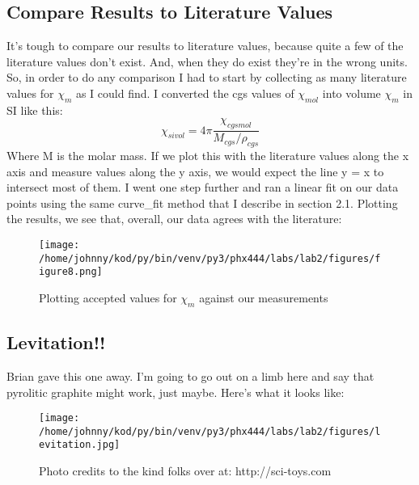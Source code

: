 \documentclass{article}
\begin{document}
\subsection{Compare Results to Literature Values}
It's tough to compare our results to literature values, because quite a few of
the literature values don't exist. And, when they do exist they're in the wrong
units. So, in order to do any comparison I had to start by collecting as many
literature values for $\chi_m$ as I could find. I converted the cgs values of
$\chi_{mol}$ into volume $\chi_m$ in SI like this:
$$\chi_{sivol} = 4 \pi\frac{\chi_{cgsmol}}{M_{cgs} / \rho_{cgs}} $$
Where M is the molar mass. If we plot this with the literature values along the
x axis and measure values along the y axis, we would expect the line y = x to
intersect most of them. I went one step further and ran a linear fit on our
data points using the same curve\_fit method that I describe in section 2.1.
Plotting the results, we see that, overall, our data agrees with the
literature:


\begin{figure}[H]
        \begin{center}
        \texttt{[image: /home/johnny/kod/py/bin/venv/py3/phx444/labs/lab2/figures/figure8.png]}
        \caption{Plotting accepted values for $\chi_m$ against our measurements}
        \label{fig:fig_5}
        \end{center}
\end{figure}

\subsection{Levitation!!}
Brian gave this one away. I'm going to go out on a limb here and say that
pyrolitic graphite might work, just maybe. Here's what it looks like:


\begin{figure}[H]
        \begin{center}
        \texttt{[image: /home/johnny/kod/py/bin/venv/py3/phx444/labs/lab2/figures/levitation.jpg]}
        \caption{Photo credits to the kind folks over at: http://sci-toys.com}
        \label{fig:fig_6}
        \end{center}
\end{figure}
\end{document}
